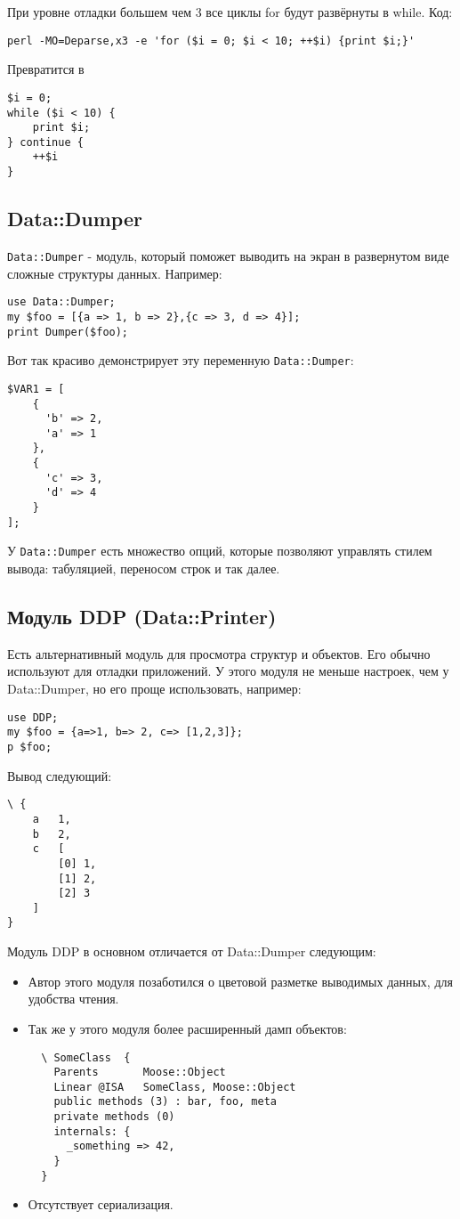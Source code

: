 При уровне отладки большем чем 3 все циклы for будут развёрнуты в while. Код:
\begin{verbatim}
perl -MO=Deparse,x3 -e 'for ($i = 0; $i < 10; ++$i) {print $i;}'
\end{verbatim}
Превратится в
\begin{verbatim}
$i = 0;
while ($i < 10) {
    print $i;
} continue {
    ++$i
}
\end{verbatim}
\subsection{Data::Dumper}
\verb|Data::Dumper| - модуль, который поможет выводить на экран в развернутом виде сложные структуры данных. Например:
\begin{verbatim}
use Data::Dumper;
my $foo = [{a => 1, b => 2},{c => 3, d => 4}];
print Dumper($foo);
\end{verbatim}
Вот так красиво демонстрирует эту переменную \verb|Data::Dumper|:
\begin{verbatim}
$VAR1 = [
    {
      'b' => 2,
      'a' => 1
    },
    {
      'c' => 3,
      'd' => 4
    }
];
\end{verbatim}
У \verb|Data::Dumper| есть множество опций, которые позволяют управлять стилем вывода: табуляцией, переносом строк и так далее.

\subsection{Модуль DDP (Data::Printer)}
Есть альтернативный модуль для просмотра структур и объектов. Его обычно используют для отладки приложений. У этого модуля не меньше настроек, чем у Data::Dumper, но его проще использовать, например:
\begin{verbatim}
use DDP;
my $foo = {a=>1, b=> 2, c=> [1,2,3]};
p $foo;
\end{verbatim}
Вывод следующий:
\begin{verbatim}
\ {
    a   1,
    b   2,
    c   [
        [0] 1,
        [1] 2,
        [2] 3
    ]
}
\end{verbatim}
Модуль DDP в основном отличается от Data::Dumper следующим:
\begin{itemize}
  \item Автор этого модуля позаботился о цветовой разметке выводимых данных, для удобства чтения.
  \item Так же у этого модуля более расширенный дамп объектов:
  \begin{verbatim}
  \ SomeClass  {
    Parents       Moose::Object
    Linear @ISA   SomeClass, Moose::Object
    public methods (3) : bar, foo, meta
    private methods (0)
    internals: {
      _something => 42,
    }
  }
  \end{verbatim}
  \item Отсутствует сериализация.
\end{itemize}

